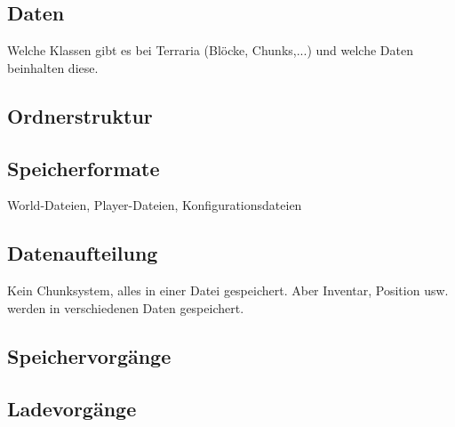 \subsection{Daten}
Welche Klassen gibt es bei Terraria (Blöcke, Chunks,...) und welche Daten 
beinhalten diese.

\subsection{Ordnerstruktur}

\subsection{Speicherformate}
World-Dateien, Player-Dateien, Konfigurationsdateien 

\subsection{Datenaufteilung}
Kein Chunksystem, alles in einer Datei gespeichert. Aber Inventar, Position
usw. werden in verschiedenen Daten gespeichert.

\subsection{Speichervorgänge}

\subsection{Ladevorgänge}

